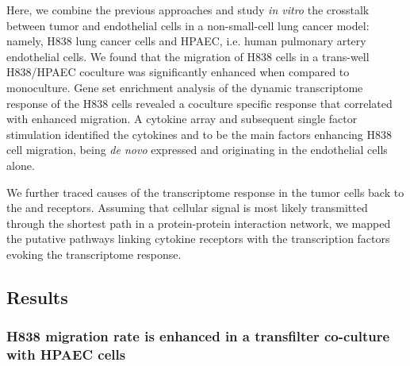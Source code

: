 Here, we combine the previous approaches and
study \emph{in vitro} the crosstalk between tumor and 
endothelial cells in  a non-small-cell lung cancer model: namely,
H838 lung cancer cells and HPAEC, i.e. human pulmonary artery endothelial cells.
We found that the  migration of  H838 cells in a trans-well H838/HPAEC coculture
was significantly enhanced when compared to monoculture.
Gene set enrichment analysis of the dynamic transcriptome
response of the H838 cells  revealed a coculture specific response 
that correlated with enhanced migration.
A cytokine array and subsequent single factor stimulation
identified the cytokines \tnfa and \sdfonea
to be the main factors enhancing H838 cell migration,
being \emph{de novo} expressed and originating in the endothelial cells alone. 

We further 
traced causes of the transcriptome response in the tumor cells back to the
\tnfa and \sdfonea receptors. %
Assuming that cellular signal is most likely transmitted through the shortest 
path in a protein-protein interaction network, we 
mapped the putative pathways linking cytokine receptors with the 
transcription factors evoking the transcriptome response. 



\subsection{Results}

\subsubsection{H838 migration rate is enhanced in a transfilter co-culture with HPAEC cells}

